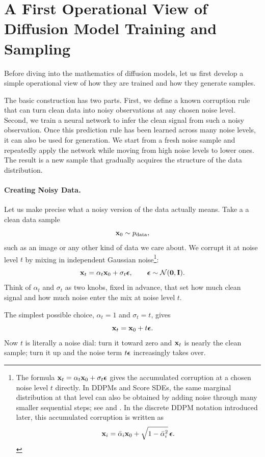 \newpage
\section*{A First Operational View of Diffusion Model Training and Sampling}

Before diving into the mathematics of diffusion models, let us first develop
a simple operational view of how they are trained and how they generate
samples.

The basic construction has two parts. First, we define a known corruption
rule that can turn clean data into noisy observations at any chosen noise
level. Second, we train a neural network to infer the clean signal from such
a noisy observation. Once this prediction rule has been learned across many noise levels, it can
also be used for generation. We start from a fresh noise sample and repeatedly
apply the network while moving from high noise levels to lower ones. The
result is a new sample that gradually acquires the structure of the data
distribution.

\paragraph{Creating Noisy Data.}

Let us make precise what a noisy version of the data actually means. Take
a a clean data sample
\[
{\mathbf{x}}_0\sim p_{\mathrm{data}},
\]
such as an image or any other kind of data we care about. We corrupt it at
noise level $t$ by mixing in independent Gaussian noise\footnote{
The formula
${\mathbf{x}}_t=\alpha_t{\mathbf{x}}_0+\sigma_t{\bm{\epsilon}}$
gives the accumulated corruption at a chosen noise level $t$ directly.
In DDPMs and Score SDEs, the same marginal distribution at that level can
also be obtained by adding noise through many smaller sequential steps; see
 and . In the discrete DDPM notation introduced later,
this accumulated corruption is written as
\[
{\mathbf{x}}_i
=
\bar{\alpha}_i{\mathbf{x}}_0
+
\sqrt{1-\bar{\alpha}_i^2}\,{\bm{\epsilon}}.
\]
}:
\[
{\mathbf{x}}_t
=
\alpha_t{\mathbf{x}}_0+\sigma_t{\bm{\epsilon}},
\qquad
{\bm{\epsilon}}\sim\mathcal{N}(\bm{0},{\mathbf{I}}).
\]
Think of $\alpha_t$ and $\sigma_t$ as two knobs, fixed in advance, that
set how much clean signal and how much noise enter the mix at noise level
$t$.

The simplest possible choice, $\alpha_t=1$ and $\sigma_t=t$, gives
\[
{\mathbf{x}}_t={\mathbf{x}}_0+t{\bm{\epsilon}}.
\]
Now $t$ is literally a noise dial: turn it toward zero and ${\mathbf{x}}_t$ is
nearly the clean sample; turn it up and the noise term $t{\bm{\epsilon}}$
increasingly takes over.

